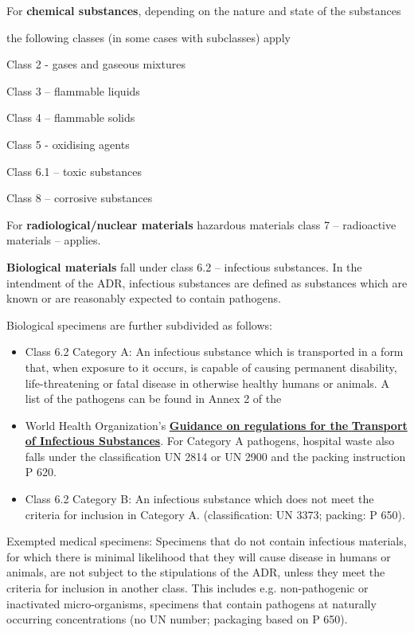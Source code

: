 \documentclass{article}
\begin{document}
For\textbf{ chemical substances}, depending on the nature and state of the substances


the following classes (in some cases with subclasses) apply


Class 2 - gases and gaseous mixtures


Class 3 – flammable liquids


Class 4 – flammable solids


Class 5 - oxidising agents


Class 6.1 – toxic substances


Class 8 – corrosive substances


For\textbf{ radiological/nuclear materials} hazardous materials class 7 – radioactive materials – applies.


\textbf{Biological materials} fall under class 6.2 –\textbf{ }infectious substances. In the intendment of the ADR, infectious substances are defined as substances which are known or are reasonably expected to contain pathogens.


Biological specimens are further subdivided as follows:

\begin{itemize}
\item Class 6.2 Category A: An infectious substance which is transported in a form that, when exposure to it occurs, is capable of causing permanent disability, life-threatening or fatal disease in otherwise healthy humans or animals. A list of the pathogens can be found in Annex 2 of the


\item World Health Organization's \textbf{\href{https://www.who.int/csr/resources/publications/biosafety/WHO_HSE_EPR_2008_10.pdf}{Guidance on regulations for the}}\href{https://www.who.int/csr/resources/publications/biosafety/WHO_HSE_EPR_2008_10.pdf}{ }\textbf{\href{https://www.who.int/csr/resources/publications/biosafety/WHO_HSE_EPR_2008_10.pdf}{Transport of Infectious Substances}}. For Category A pathogens, hospital waste also falls under the classification UN 2814 or UN 2900 and the packing instruction P 620.


\item Class 6.2 Category B: An infectious substance which does not meet the criteria for inclusion in Category A. (classification: UN 3373; packing: P 650).


\end{itemize}

Exempted medical specimens: Specimens that do not contain infectious materials, for which there is minimal likelihood that they will cause disease in humans or animals, are not subject to the stipulations of the ADR, unless they meet the criteria for inclusion in another class. This includes e.g. non-pathogenic or inactivated micro-organisms, specimens that contain pathogens at naturally occurring concentrations (no UN number; packaging based on P 650).
\end{document}
